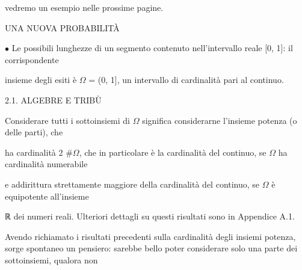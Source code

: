 \documentclass[a4paper,portrait,12pt]{article}
\begin{document}
\begin{flushleft}
vedremo un esempio nelle prossime pagine.
\end{flushleft}










\begin{flushleft}
UNA NUOVA PROBABILIT\`{A}
\end{flushleft}





\begin{flushleft}
$\bullet$ Le possibili lunghezze di un segmento contenuto nell'intervallo reale [0, 1]: il corrispondente
\end{flushleft}


\begin{flushleft}
insieme degli esiti \`{e} $\Omega$ = (0, 1], un intervallo di cardinalit\`{a} pari al continuo.
\end{flushleft}





\begin{flushleft}
2.1. ALGEBRE E TRIBÙ
\end{flushleft}


\begin{flushleft}
Considerare tutti i sottoinsiemi di $\Omega$ significa considerarne l'insieme potenza (o delle parti), che
\end{flushleft}


\begin{flushleft}
ha cardinalit\`{a} 2 \#$\Omega$, che in particolare \`{e} la cardinalit\`{a} del continuo, se $\Omega$ ha cardinalit\`{a} numerabile
\end{flushleft}


\begin{flushleft}
e addirittura strettamente maggiore della cardinalit\`{a} del continuo, se $\Omega$ \`{e} equipotente all'insieme
\end{flushleft}


\begin{flushleft}
ℝ dei numeri reali. Ulteriori dettagli su questi risultati sono in Appendice A.1.
\end{flushleft}


\begin{flushleft}
Avendo richiamato i risultati precedenti sulla cardinalit\`{a} degli insiemi potenza, sorge spontaneo un pensiero: sarebbe bello poter considerare solo una parte dei sottoinsiemi, qualora non
\end{flushleft}
\end{document}
